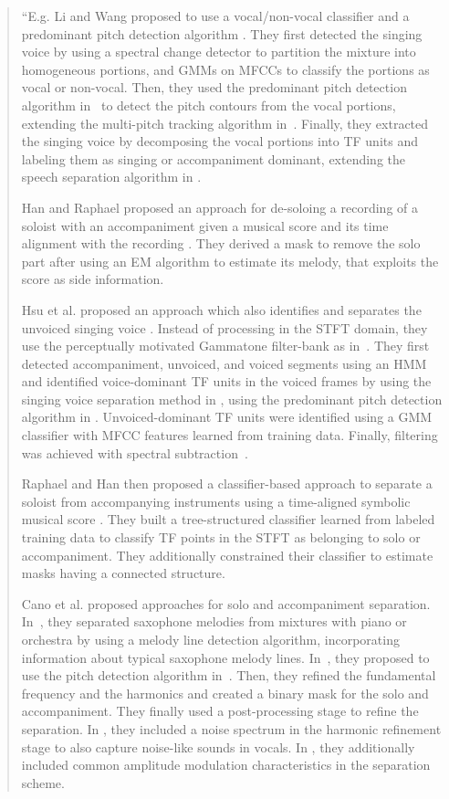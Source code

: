 \begin{quote}
``E.g. Li and Wang proposed to use a vocal/non-vocal classifier and a predominant pitch detection algorithm \cite{li06, li07}. They first detected the singing voice by using a spectral change detector \cite{duxbury03} to partition the mixture into homogeneous portions, and GMMs on MFCCs to classify the portions as vocal or non-vocal. Then, they used the predominant pitch detection algorithm in~\cite{li05} to detect the pitch contours from the vocal portions, extending the multi-pitch tracking algorithm in~\cite{wu03}. Finally, they extracted the singing voice by decomposing the vocal portions into TF units and labeling them as singing or accompaniment dominant, extending the speech separation algorithm in \cite{hu02}.
\par
Han and Raphael proposed an approach for de-soloing a recording of a soloist with an accompaniment given a musical score and its time alignment with the recording \cite{han07}. They derived a mask \cite{roweis01} to remove the solo part after using an EM algorithm to estimate its melody, that exploits the score as side information.
\par
Hsu et al. proposed an approach which also identifies and separates the unvoiced singing voice \cite{hsu08,hsu10}. Instead of processing in the \acs{STFT} domain, they use the perceptually motivated Gammatone filter-bank as in~\cite{hu02,li07}. They first detected accompaniment, unvoiced, and voiced segments using an HMM and identified voice-dominant TF units in the voiced frames by using the singing voice separation method in \cite{li07}, using the predominant pitch detection algorithm in \cite{dressler062}. Unvoiced-dominant TF units were identified using a GMM classifier with MFCC features learned from training data. Finally, filtering was achieved with spectral subtraction~\cite{scalart96}.
\par
Raphael and Han then proposed a classifier-based approach to separate a soloist from accompanying instruments using a time-aligned symbolic musical score \cite{raphael08}. They built a tree-structured classifier \cite{breiman84} learned from labeled training data to classify TF points in the \acs{STFT} as belonging to solo or accompaniment. They additionally constrained their classifier to estimate masks having a connected structure.
\par
Cano et al. proposed approaches for solo and accompaniment separation. In~\cite{cano09}, they separated saxophone melodies from mixtures with piano or orchestra by using a melody line detection algorithm, incorporating information about typical saxophone melody lines. In~\cite{grollmisch11,dittmar12,cano12}, they proposed to use the pitch detection algorithm in~\cite{dressler11}. Then, they refined the fundamental frequency and the harmonics and created a binary mask for the solo and accompaniment. They finally used a post-processing stage to refine the separation. In \cite{cano13}, they included a noise spectrum in the harmonic refinement stage to also capture noise-like sounds in vocals. In \cite{cano14}, they additionally included common amplitude modulation characteristics in the separation scheme.

\end{quote}
